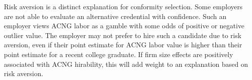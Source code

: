 Risk aversion is a distinct explanation for conformity selection.
Some employers are not able to evaluate an alternative credential with confidence.
Such an employer views ACNG labor as a gamble with some odds of positive or negative outlier value.
The employer may not prefer to hire such a candidate due to risk aversion,
even if their point estimate for ACNG labor value is higher than their point estimate for a recent college graduate.
If firm size effects are positively associated with ACNG hirability, this will add weight to an explanation based on risk aversion.

